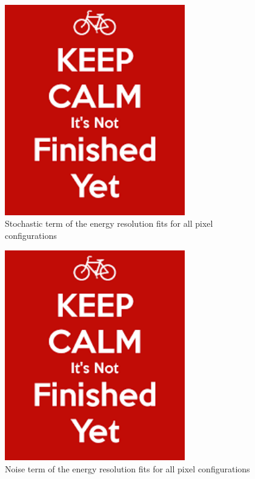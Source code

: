 \begin{figure}
  \centering
  \includegraphics[width=0.7\textwidth,keepaspectratio]{DECALStudies/fig/dummy}
  \caption{Stochastic term of the energy resolution fits for all pixel configurations}
  \label{fig:stochastictermDigi}
\end{figure}
\begin{figure}
  \centering
  \includegraphics[width=0.7\textwidth,keepaspectratio]{DECALStudies/fig/dummy}
  \caption{Noise term of the energy resolution fits for all pixel configurations}
  \label{fig:noisetermDigi}
\end{figure}
